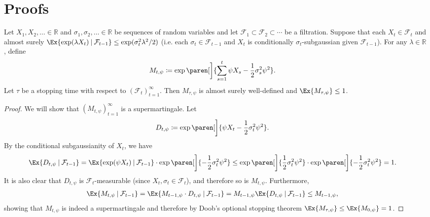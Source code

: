 \documentclass{article}
\newcommand{\defeq}{\coloneq}
\newcommand{\Real}{\mathds{R}}
\newcommand\given[1][\delimsize]{%
  \providecommand{\delimsize}{}
  \nonscript\:#1\vert\allowbreak\nonscript\:\mathopen{}
}
\DeclarePairedDelimiter{\paren}()
\begin{document}
\section{Proofs}

\begin{lemma}\label{lemma:martingale-mgf}
  Let $X_1, X_2, \dotsc \in \Real$ and
  $\sigma_1, \sigma_2, \dotsc \in \Real$ be sequences of random
  variables and let
  $\mathcal{F}_1 \subset \mathcal{F}_2 \subset \dotsb$ be a
  filtration.  Suppose that each $X_t \in \mathcal{F}_t$ and almost
  surely
  $\Ex{\exp(\lambda X_t)\given \mathcal{F}_{t-1}} \le
  \exp(\sigma_t^2\lambda^2/2)$ (i.e. each
  $\sigma_t \in \mathcal{F}_{t-1}$ and $X_t$ is conditionally
  $\sigma_t$-subgaussian given $\mathcal{F}_{t-1}$).  For any
  $\lambda\in\Real$, define
  \begin{align*}
    M_{t,\psi} &\defeq \exp\paren[\bigg]{\sum_{s=1}^t \psi X_s - \frac{1}{2}\sigma_s^2\psi^2}.
  \end{align*}
  Let $\tau$ be a stopping time with respect to
  ${(\mathcal{F}_t)}_{t=1}^\infty$.  Then $M_{\tau,\psi}$ is almost surely
  well-defined and $\Ex{M_{\tau,\psi}} \le 1$.

  \begin{proof}
    We will show that ${(M_{t,\psi})}_{t=1}^\infty$ is a
    supermartingale.  Let
    \begin{align*}
      D_{t,\psi} &\defeq \exp\paren[\bigg]{\psi X_t - \frac{1}{2}\sigma_t^2\psi^2}.
    \end{align*}
    By the conditional subgaussianity of $X_t$, we have
    \begin{align*}
      \Ex{D_{t,\psi}\given\mathcal{F}_{t-1}}
      &= \Ex{\exp(\psi X_t)\given\mathcal{F}_{t-1}}
        \cdot \exp\paren[\bigg]{-\frac{1}{2}\sigma_t^2\psi^2}
      \le \exp\paren[\bigg]{\frac{1}{2}\sigma_t^2\psi^2}
        \cdot \exp\paren[\bigg]{-\frac{1}{2}\sigma_t^2\psi^2}
      = 1.
    \end{align*}
    It is also clear that $D_{t,\psi}$ is $\mathcal{F}_t$-measurable
    (since $X_t,\sigma_t \in \mathcal{F}_t$), and therefore so is
    $M_{t,\psi}$.  Furthermore,
    \begin{align*}
      \Ex{M_{t,\psi}\given\mathcal{F}_{t-1}}
      &= \Ex{M_{t-1,\psi}\cdot D_{t,\psi}\given\mathcal{F}_{t-1}}
        = M_{t-1,\psi} \Ex{D_{t,\psi}\given\mathcal{F}_{t-1}}
        \le M_{t-1,\psi},
    \end{align*}
    showing that $M_{t,\psi}$ is indeed a supermartingale and therefore
    by Doob's optional stopping theorem
    $\Ex{M_{\tau,\psi}} \le \Ex{M_{0,\psi}} = 1$.


\end{proof}
\end{lemma}
\end{document}
